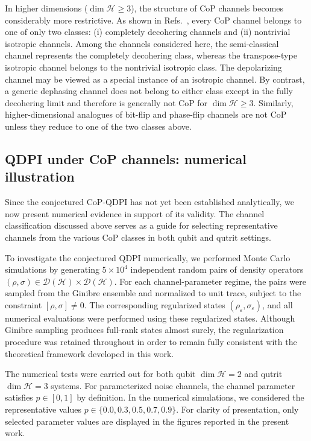 \documentclass[a4paper, amsfonts, amssymb, amsmath, reprint, showkeys, nofootinbib, twoside, aps, pra]{revtex4-2}
\theoremstyle{definition}
\begin{document}
In higher dimensions ($\dim\mathcal H\ge 3$), the structure of CoP channels becomes considerably more restrictive. As shown in Refs.~\cite{Yu2011,Guo_2013}, every CoP channel belongs to one of only two classes: (i) completely decohering channels and (ii) nontrivial isotropic channels. Among the channels considered here, the semi-classical channel represents the completely decohering class, whereas the transpose-type isotropic channel belongs to the nontrivial isotropic class. The depolarizing channel may be viewed as a special instance of an isotropic channel. By contrast, a generic dephasing channel does not belong to either class except in the fully decohering limit and therefore is generally not CoP for $\dim\mathcal H\ge 3$. Similarly, higher-dimensional analogues of bit-flip and phase-flip channels are not CoP unless they reduce to one of the two classes above.



\subsection{QDPI under CoP channels: numerical illustration}
\label{sec:QDPI-numerical}

Since the conjectured CoP-QDPI has not yet been established analytically, we now present numerical evidence in support of its validity. The channel classification discussed above serves as a guide for selecting representative channels from the various CoP classes in both qubit and qutrit settings.

To investigate the conjectured QDPI numerically, we performed Monte Carlo simulations by generating $5\times10^4$ independent random pairs of density operators
$ (\rho,\sigma)\in\mathcal D(\mathcal H)\times \mathcal D(\mathcal H).$ For each channel-parameter regime, the pairs were sampled from the Ginibre ensemble and normalized to unit trace, subject to the constraint $[\rho,\sigma]\neq0.$ The corresponding regularized states $(\rho_\varepsilon,\sigma_\varepsilon)$, and all numerical evaluations were performed using these regularized states. Although Ginibre sampling produces full-rank states almost surely, the regularization procedure was retained throughout in order to remain fully consistent with the theoretical framework developed in this work.

The numerical tests were carried out for both qubit $\dim\mathcal H = 2$ and qutrit $ \dim\mathcal H = 3 $ systems. For parameterized noise channels, the channel parameter satisfies $p\in[0,1]$ by definition. In the numerical simulations, we considered the representative values $p \in \{0.0, 0.3, 0.5, 0.7, 0.9\}$. For clarity of presentation, only selected parameter values are displayed in the figures reported in the present work.
\end{document}
